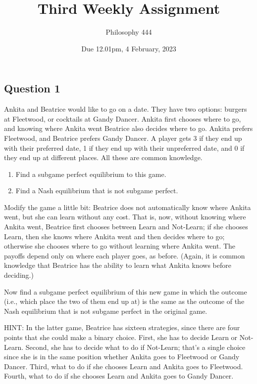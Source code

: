 \documentclass[
  11pt,
]{article}
\title{Third Weekly Assignment}
\author{Philosophy 444}
\date{Due 12.01pm, 4 February, 2023}
\providecommand{\tightlist}{%
  \setlength{\itemsep}{0pt}\setlength{\parskip}{0pt}}
\begin{document}
\maketitle

\hypertarget{question-1}{%
\subsection{Question 1}\label{question-1}}

Ankita and Beatrice would like to go on a date. They have two options:
burgers at Fleetwood, or cocktails at Gandy Dancer. Ankita first chooses
where to go, and knowing where Ankita went Beatrice also decides where
to go. Ankita prefers Fleetwood, and Beatrice prefers Gandy Dancer. A
player gets 3 if they end up with their preferred date, 1 if they end up
with their unpreferred date, and 0 if they end up at different places.
All these are common knowledge.

\begin{enumerate}
\def\labelenumi{\alph{enumi}.}
\tightlist
\item
  Find a subgame perfect equilibrium to this game.
\item
  Find a Nash equilibrium that is not subgame perfect.
\end{enumerate}

Modify the game a little bit: Beatrice does not automatically know where
Ankita went, but she can learn without any cost. That is, now, without
knowing where Ankita went, Beatrice first chooses between Learn and
Not-Learn; if she chooses Learn, then she knows where Ankita went and
then decides where to go; otherwise she chooses where to go without
learning where Ankita went. The payoffs depend only on where each player
goes, as before. (Again, it is common knowledge that Beatrice has the
ability to learn what Ankita knows before deciding.)

Now find a subgame perfect equilibrium of this new game in which the
outcome (i.e., which place the two of them end up at) is the same as the
outcome of the Nash equilibrium that is not subgame perfect in the
original game.

HINT: In the latter game, Beatrice has sixteen strategies, since there
are four points that she could make a binary choice. First, she has to
decide Learn or Not-Learn. Second, she has to decide what to do if
Not-Learn; that's a single choice since she is in the same position
whether Ankita goes to Fleetwood or Gandy Dancer. Third, what to do if
she chooses Learn and Ankita goes to Fleetwood. Fourth, what to do if
she chooses Learn and Ankita goes to Gandy Dancer.
\end{document}
